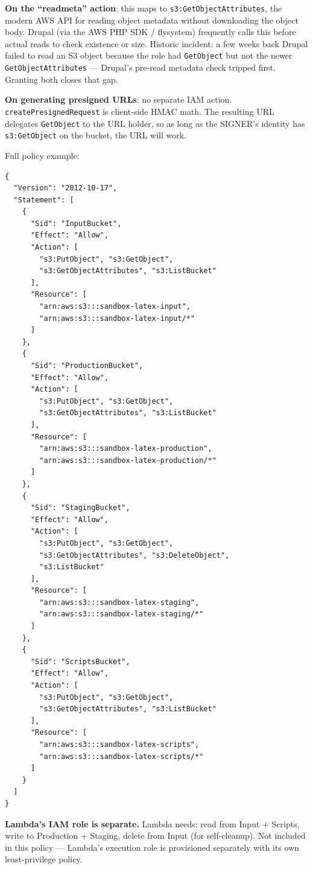 \documentclass[11pt,letterpaper]{article}
\begin{document}
\textbf{On the ``readmeta'' action}: this maps to \texttt{s3:GetObjectAttributes}, the modern AWS API for reading object metadata without downloading the object body. Drupal (via the AWS PHP SDK / flysystem) frequently calls this before actual reads to check existence or size. Historic incident: a few weeks back Drupal failed to read an S3 object because the role had \texttt{GetObject} but not the newer \texttt{GetObjectAttributes} --- Drupal's pre-read metadata check tripped first. Granting both closes that gap.

\textbf{On generating presigned URLs}: no separate IAM action. \texttt{createPresignedRequest} is client-side HMAC math. The resulting URL delegates \texttt{GetObject} to the URL holder, so as long as the SIGNER's identity has \texttt{s3:GetObject} on the bucket, the URL will work.

Full policy example:

\begin{lstlisting}[style=worxcode]
{
  "Version": "2012-10-17",
  "Statement": [
    {
      "Sid": "InputBucket",
      "Effect": "Allow",
      "Action": [
        "s3:PutObject", "s3:GetObject",
        "s3:GetObjectAttributes", "s3:ListBucket"
      ],
      "Resource": [
        "arn:aws:s3:::sandbox-latex-input",
        "arn:aws:s3:::sandbox-latex-input/*"
      ]
    },
    {
      "Sid": "ProductionBucket",
      "Effect": "Allow",
      "Action": [
        "s3:PutObject", "s3:GetObject",
        "s3:GetObjectAttributes", "s3:ListBucket"
      ],
      "Resource": [
        "arn:aws:s3:::sandbox-latex-production",
        "arn:aws:s3:::sandbox-latex-production/*"
      ]
    },
    {
      "Sid": "StagingBucket",
      "Effect": "Allow",
      "Action": [
        "s3:PutObject", "s3:GetObject",
        "s3:GetObjectAttributes", "s3:DeleteObject",
        "s3:ListBucket"
      ],
      "Resource": [
        "arn:aws:s3:::sandbox-latex-staging",
        "arn:aws:s3:::sandbox-latex-staging/*"
      ]
    },
    {
      "Sid": "ScriptsBucket",
      "Effect": "Allow",
      "Action": [
        "s3:PutObject", "s3:GetObject",
        "s3:GetObjectAttributes", "s3:ListBucket"
      ],
      "Resource": [
        "arn:aws:s3:::sandbox-latex-scripts",
        "arn:aws:s3:::sandbox-latex-scripts/*"
      ]
    }
  ]
}
\end{lstlisting}

\textbf{Lambda's IAM role is separate.} Lambda needs: read from Input + Scripts, write to Production + Staging, delete from Input (for self-cleanup). Not included in this policy --- Lambda's execution role is provisioned separately with its own least-privilege policy.
\end{document}
